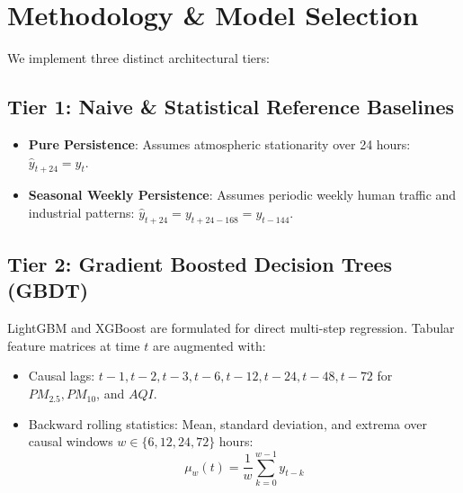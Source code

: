 \documentclass[10pt,journal,compsoc,twocolumn]{article}
\begin{document}
\section{Methodology \& Model Selection}
We implement three distinct architectural tiers:

\subsection{Tier 1: Naive \& Statistical Reference Baselines}
\begin{itemize}
    \item \textbf{Pure Persistence}: Assumes atmospheric stationarity over 24 hours: $\hat{y}_{t+24} = y_t$.
    \item \textbf{Seasonal Weekly Persistence}: Assumes periodic weekly human traffic and industrial patterns: $\hat{y}_{t+24} = y_{t+24 - 168} = y_{t - 144}$.
\end{itemize}

\subsection{Tier 2: Gradient Boosted Decision Trees (GBDT)}
LightGBM and XGBoost are formulated for direct multi-step regression. Tabular feature matrices at time $t$ are augmented with:
\begin{itemize}
    \item Causal lags: $t-1, t-2, t-3, t-6, t-12, t-24, t-48, t-72$ for $PM_{2.5}, PM_{10}$, and $AQI$.
    \item Backward rolling statistics: Mean, standard deviation, and extrema over causal windows $w \in \{6, 12, 24, 72\}$ hours:
    \begin{equation}
        \mu_{w}(t) = \frac{1}{w}\sum_{k=0}^{w-1} y_{t-k}
    \end{equation}
\end{itemize}
\end{document}
